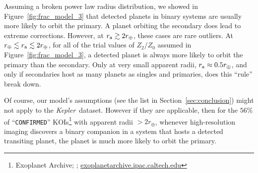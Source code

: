 \documentclass[12pt,modern]{aastex61}
\renewcommand{\a}{_{\rm a}}
\begin{document}

Assuming a broken power law radius distribution, we showed in
Figure~\ref{fig:frac_model_3} that detected planets in binary systems
are usually more likely to orbit the primary.  A planet orbiting the
secondary does lead to extreme corrections.  However, at $r\a \gtrsim
2r_\oplus$, these cases are rare outliers.  At $r_\oplus \lesssim r\a
\lesssim 2r_\oplus$, for all of the trial values of $Z_2/Z_0$ assumed
in Figure~\ref{fig:frac_model_3}, a detected planet is always more
likely to orbit the primary than the secondary.  Only at very small
apparent radii, $r\a \approx 0.5r_\oplus$, and only if secondaries
host as many planets as singles and primaries, does this ``rule''
break down.

Of course, our model's assumptions (see the list in
Section~\ref{sec:conclusion}) might not apply to the {\it Kepler}\
dataset.  However if they are applicable, then for the $56\%$ of
``\texttt{CONFIRMED}'' KOIs\footnote{Exoplanet Archive;
\cite{akeson_nasa_2013}; \url{exoplanetarchive.ipac.caltech.edu}} with
apparent radii $>2r_\oplus$, whenever high-resolution imaging
discovers a binary companion in a system that hosts a detected
transiting planet, the planet is much more likely to orbit the
primary.
\end{document}

